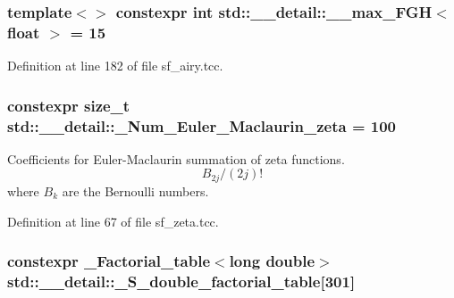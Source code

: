 \subsubsection[{\texorpdfstring{\+\_\+\+\_\+max\+\_\+\+F\+G\+H$<$ float $>$}{__max_FGH< float >}}]{\setlength{\rightskip}{0pt plus 5cm}template$<$$>$ constexpr int {\bf std\+::\+\_\+\+\_\+detail\+::\+\_\+\+\_\+max\+\_\+\+F\+GH}$<$ float $>$ = 15}\hypertarget{namespacestd_1_1____detail_a67195934ce49105fd7b765e669a5a2a0}{}\label{namespacestd_1_1____detail_a67195934ce49105fd7b765e669a5a2a0}


Definition at line 182 of file sf\+\_\+airy.\+tcc.

\subsubsection[{\texorpdfstring{\+\_\+\+Num\+\_\+\+Euler\+\_\+\+Maclaurin\+\_\+zeta}{_Num_Euler_Maclaurin_zeta}}]{\setlength{\rightskip}{0pt plus 5cm}constexpr size\+\_\+t std\+::\+\_\+\+\_\+detail\+::\+\_\+\+Num\+\_\+\+Euler\+\_\+\+Maclaurin\+\_\+zeta = 100}\hypertarget{namespacestd_1_1____detail_ab27e687e1052be7a72de187e0dead124}{}\label{namespacestd_1_1____detail_ab27e687e1052be7a72de187e0dead124}
Coefficients for Euler-\/\+Maclaurin summation of zeta functions. \[ B_{2j} / (2j)! \] where $ B_k $ are the Bernoulli numbers. 

Definition at line 67 of file sf\+\_\+zeta.\+tcc.

\subsubsection[{\texorpdfstring{\+\_\+\+S\+\_\+double\+\_\+factorial\+\_\+table}{_S_double_factorial_table}}]{\setlength{\rightskip}{0pt plus 5cm}constexpr {\bf \+\_\+\+Factorial\+\_\+table}$<$long double$>$ std\+::\+\_\+\+\_\+detail\+::\+\_\+\+S\+\_\+double\+\_\+factorial\+\_\+table\mbox{[}301\mbox{]}}\hypertarget{namespacestd_1_1____detail_a6d1131fefdb30b2746c76ff801bdc833}{}\label{namespacestd_1_1____detail_a6d1131fefdb30b2746c76ff801bdc833}


